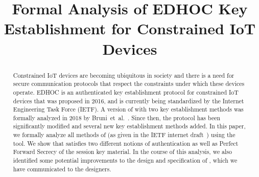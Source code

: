 \documentclass[runningheads, envcountsame, hidelinks, a4paper, draft, x11names]{llncs}
\begin{document}
\title{Formal Analysis of EDHOC Key Establishment for Constrained IoT Devices}
%
\author{}
%
%
\authorrunning{}
%
\institute{}
%
\maketitle
%


\begin{abstract}
Constrained IoT devices are becoming ubiquitous in society
and there is a need for secure communication protocols that respect the
constraints under which these devices operate.
%
EDHOC is an authenticated key establishment protocol for constrained IoT
devices that was proposed in 2016, and is currently being standardized by the
Internet Engineering Task Force (IETF).
%
A version of \mEdhoc{} with two key establishment methods was formally analyzed
in 2018 by Bruni~et~al.~\cite{DBLP:conf/secsr/BruniJPS18}.
%
Since then, the protocol has been significantly modified and several new key
establishment methods added.
%
In this paper, we formally analyze all methods of \mEdhoc{} (as given in
the IETF internet draft~\cite{our-analysis-selander-lake-edhoc-01}) using the
\mTamarin{} tool.
%
We show that \mEdhoc{} satisfies two different notions of authentication
as well as Perfect Forward Secrecy of the session key material.
%
In the course of this analysis, we also identified some potential improvements to the
design and specification of \mEdhoc, which we have communicated to
the designers.
%
\end{abstract}
%
\end{document}

